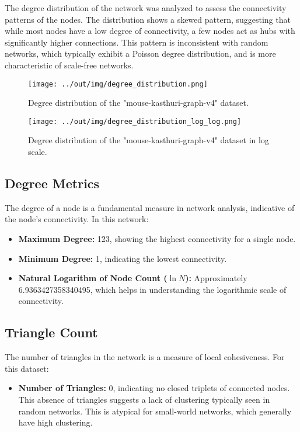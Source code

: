 \documentclass[
	report, %
	11pt, %
]{CSUniSchoolLabReport}
\begin{document}
	The degree distribution of the network was analyzed to assess the connectivity patterns of the nodes. The distribution shows a skewed pattern, suggesting that while most nodes have a low degree of connectivity, a few nodes act as hubs with significantly higher connections. This pattern is inconsistent with random networks, which typically exhibit a Poisson degree distribution, and is more characteristic of scale-free networks.

	\begin{figure}[!ht]
		\centering
		\captionsetup{justification=centering}
		\texttt{[image: ../out/img/degree\_distribution.png]}
		\caption{Degree distribution of the "mouse-kasthuri-graph-v4" dataset.}
		\label{fig:deg_dist}
	\end{figure}

	\begin{figure}[!ht]
		\centering
		\captionsetup{justification=centering}
		\texttt{[image: ../out/img/degree\_distribution\_log\_log.png]}
		\caption{Degree distribution of the "mouse-kasthuri-graph-v4" dataset in log scale.}
		\label{fig:log_deg_dist}
	\end{figure}

	\subsection{Degree Metrics}

	The degree of a node is a fundamental measure in network analysis, indicative of the node's connectivity. In this network:
	\vspace{10pt}

	\begin{itemize}
		\item \textbf{Maximum Degree:} 123, showing the highest connectivity for a single node.
		\item \textbf{Minimum Degree:} 1, indicating the lowest connectivity.
		\item \textbf{Natural Logarithm of Node Count (\(\ln N\)):} Approximately \num{6.9363427358340495}, which helps in understanding the logarithmic scale of connectivity.
	\end{itemize}


	\subsection{Triangle Count}

	The number of triangles in the network is a measure of local cohesiveness. For this dataset:
	\begin{itemize}
		\item \textbf{Number of Triangles:} 0, indicating no closed triplets of connected nodes. This absence of triangles suggests a lack of clustering typically seen in random networks. This is atypical for small-world networks, which generally have high clustering.
	\end{itemize}
\end{document}
